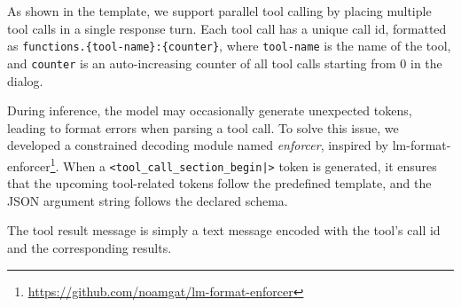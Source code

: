 As shown in the template, we support parallel tool calling by placing multiple tool calls in a single response turn. 
Each tool call has a unique call id, formatted as \texttt{functions.\{tool-name\}:\{counter\}}, 
where \texttt{tool-name} is the name of the tool, and \texttt{counter} is an auto-increasing counter of all tool calls starting from 0 in the dialog.

During inference, the model may occasionally generate unexpected tokens, leading to format errors when parsing a tool call. To solve this issue, we developed a constrained decoding module named \emph{enforcer}, inspired by {lm-format-enforcer}\footnote{\url{https://github.com/noamgat/lm-format-enforcer}}. When a \texttt{<tool\_call\_section\_begin|>} token is generated, it ensures that the upcoming tool-related tokens follow the predefined template, and the JSON argument string follows the declared schema.

The tool result message is simply a text message encoded with the tool's call id and the corresponding results.
\begin{center}
\end{center}

